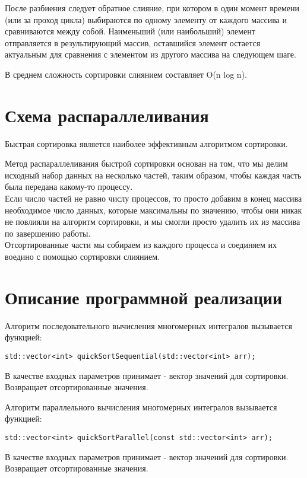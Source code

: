 \documentclass{report}
\begin{document}
После разбиения следует обратное слияние, при котором в один момент времени (или за проход цикла) выбираются по одному элементу от каждого массива и сравниваются между собой. Наименьший (или наибольший) элемент отправляется в результирующий массив, оставшийся элемент остается актуальным для сравнения с элементом из другого массива на следующем шаге.

В среднем сложность сортировки слиянием составляет O(n log n).
\newpage

\section*{Схема распараллеливания}
Быстрая сортировка является наиболее эффективным алгоритмом сортировки.

Метод распараллеливания быстрой сортировки основан на том, что мы делим исходный набор данных на несколько частей, таким образом, чтобы каждая часть была передана какому-то процессу. \\

Если число частей не равно числу процессов, то просто добавим в конец массива необходимое число данных, которые максимальны по значению, чтобы они никак не повлияли на алгоритм сортировки, и мы смогли просто удалить их из массива по завершению работы.\\

Отсортированные части мы собираем из каждого процесса и соединяем их воедино с помощью сортировки слиянием.
\newpage

\section*{Описание программной реализации}
Алгоритм последовательного вычисления многомерных интегралов вызывается функцией:
\begin{lstlisting}
std::vector<int> quickSortSequential(std::vector<int> arr);
\end{lstlisting}
\par В качестве входных параметров принимает - вектор значений для сортировки. Возвращает отсортированные значения.
\par Алгоритм параллельного вычисления многомерных интегралов вызывается функцией:
\begin{lstlisting}
std::vector<int> quickSortParallel(const std::vector<int> arr);
\end{lstlisting}
\par В качестве входных параметров принимает - вектор значений для сортировки. Возвращает отсортированные значения.
\end{document}
